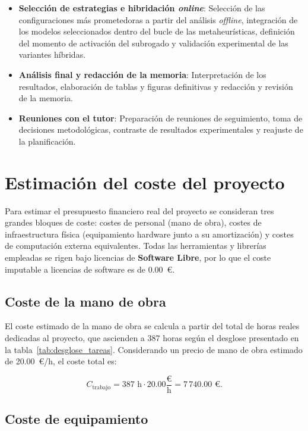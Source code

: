 \begin{itemize}
    \item \textbf{Selección de estrategias e hibridación \textit{online}}: Selección de las configuraciones más prometedoras a partir del análisis \textit{offline}, integración de los modelos seleccionados dentro del bucle de las metaheurísticas, definición del momento de activación del subrogado y validación experimental de las variantes híbridas.

    \item \textbf{Análisis final y redacción de la memoria}: Interpretación de los resultados, elaboración de tablas y figuras definitivas y redacción y revisión de la memoria.

    \item \textbf{Reuniones con el tutor}: Preparación de reuniones de seguimiento, toma de decisiones metodológicas, contraste de resultados experimentales y reajuste de la planificación.
\end{itemize}

\section{Estimación del coste del proyecto}

Para estimar el presupuesto financiero real del proyecto se consideran tres grandes bloques de coste: costes de personal (mano de obra), costes de infraestructura física (equipamiento hardware junto a su amortización) y costes de computación externa equivalentes. Todas las herramientas y librerías empleadas se rigen bajo licencias de \textbf{Software Libre}, por lo que el coste imputable a licencias de software es de 0.00~€.


\subsection{Coste de la mano de obra}

El coste estimado de la mano de obra se calcula a partir del total de horas reales dedicadas al proyecto, que ascienden a 387 horas según el desglose presentado en la tabla~\ref{tab:desglose_tareas}. Considerando un precio de mano de obra estimado de 20.00~€/h, el coste total es:

\[
    C_{\text{trabajo}} = 387 \text{ h} \cdot 20.00 \frac{\text{€}}{\text{h}} = 7\,740.00 \text{ €}.
\]

\subsection{Coste de equipamiento}

